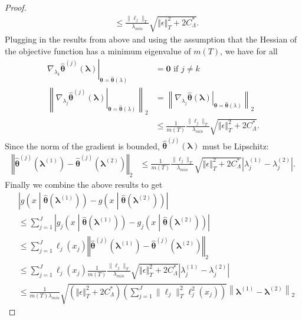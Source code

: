 \documentclass[10pt]{book}
\theoremstyle{definition}
\begin{document}
\begin{proof}
\begin{align}
	& \le \frac{\|\ell_j\|_T}{\lambda_{min}}
	\sqrt{\left\Vert \epsilon \right \Vert_T^2 + 2 C^*_{\Lambda}}.
	\end{align}
	Plugging in the results from above and using the assumption that the Hessian of the objective function has a minimum eigenvalue of $m(T)$, we have for all 
	\begin{align}
	\left .
	\nabla_{\lambda_k}\hat{\boldsymbol{\theta}}^{(j)}(\boldsymbol{\lambda})
	\right|_{\boldsymbol{\theta}=\hat{\boldsymbol{\theta}}(\lambda)}
	& = \boldsymbol{0}
	\text{ if } j\ne k
	\\
	\left \|
	\left .
	\nabla_{\lambda_j}\hat{\boldsymbol{\theta}}^{(j)}(\boldsymbol{\lambda})
	\right|_{\boldsymbol{\theta}=\hat{\boldsymbol{\theta}}(\lambda)}
	\right \|_2
	& = \left \|
	\left .
	\nabla_{\lambda_j}\hat{\boldsymbol{\theta}}(\boldsymbol{\lambda})
	\right|_{\boldsymbol{\theta}=\hat{\boldsymbol{\theta}}(\lambda)}
	\right \|_2
	\\
	& \le \frac{1}{m(T)} \frac{\|\ell_j\|_T}{\lambda_{min}}
	\sqrt{\left\Vert \epsilon \right \Vert_T^2 + 2 C^*_{\Lambda}}.
	\end{align}
	Since the norm of the gradient is bounded, $\hat{\boldsymbol{\theta}}^{(j)}(\boldsymbol{\lambda})$ must be Lipschitz:
	\begin{align}
	\left\Vert \hat{\boldsymbol{\theta}}^{(j)}(\boldsymbol{\lambda}^{(1)})
	-\hat{\boldsymbol{\theta}}^{(j)}(\boldsymbol{\lambda}^{(2)})\right\Vert _{2}
	& \le
	\frac{1}{m(T)} \frac{\|\ell_j\|_T}{\lambda_{min}}
	\sqrt{\left\Vert \epsilon \right \Vert_T^2 + 2 C^*_{\Lambda}}
	\left |{\lambda}^{(1)}_j-{\lambda}^{(2)}_j \right |.
	\label{eq:lipschitz_params}
	\end{align}
	Finally we combine the above results to get
	\begin{align}
	& \left |
	g \left (x \middle | \hat{\boldsymbol{\theta}}(\boldsymbol{\lambda}^{(1)})\right )
	- g \left (x \middle | \hat{\boldsymbol{\theta}}(\boldsymbol{\lambda}^{(2)})\right )
	\right |\\
	& \le
	\sum_{j=1}^J
	\left |
	g_j \left (x \middle | \hat{\boldsymbol{\theta}}(\boldsymbol{\lambda}^{(1)})\right )
	- g_j \left (x \middle | \hat{\boldsymbol{\theta}}(\boldsymbol{\lambda}^{(2)})\right )
	\right | \\
	& \le \sum_{j=1}^J \ell_j(x_j)
	\left\Vert \hat{\boldsymbol{\theta}}^{(j)}(\boldsymbol{\lambda}^{(1)})
	-\hat{\boldsymbol{\theta}}^{(j)}(\boldsymbol{\lambda}^{(2)})\right\Vert _{2}\\
	& \le \sum_{j=1}^J \ell_j(x_j)
	\frac{1}{m(T)} \frac{\|\ell_j\|_T}{\lambda_{min}}
	\sqrt{\left\Vert \epsilon \right \Vert_T^2 + 2 C^*_{\Lambda}}
	\left |{\lambda}^{(1)}_j-{\lambda}^{(2)}_j\right |\\
	& \le
	\frac{1}{m(T) \lambda_{min}}
	\sqrt{
		\left(
		\left\Vert \epsilon \right \Vert_T^2 + 2 C^*_{\Lambda}
		\right)
		\left(
		\sum_{j=1}^J \|\ell_j\|_T^2 \ell_j^2(x_j)
		\right)
	}
	\left \|
	\boldsymbol{\lambda}^{(1)}-\boldsymbol{\lambda}^{(2)}
	\right \|_{2}
	\end{align}
\end{proof}
\end{document}
